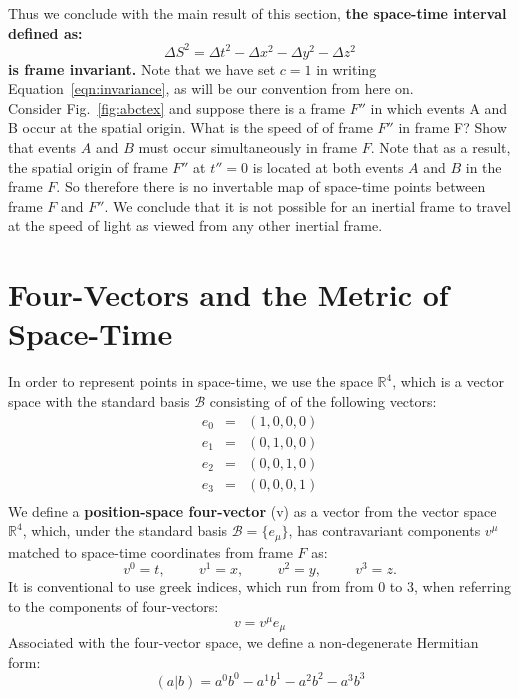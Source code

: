 \documentclass[12pt]{article}
\begin{document}
Thus we conclude with the main result of this section, {\bf the
  space-time interval defined as:}
\begin{equation}
 \label{eqn:invariance}
  \Delta S^2 = \Delta t^2 - \Delta x^2 - \Delta y^2 - \Delta z^2
\end{equation}
{\bf is frame invariant.}  Note that we have set $c=1$ in writing
Equation~\ref{eqn:invariance}, as will be our convention from here on.\\[4pt]

\exercise Consider Fig.~\ref{fig:abctex} and suppose there is a frame
$F''$ in which events A and B occur at the spatial origin.  What is
the speed of of frame $F''$ in frame F?  Show that events $A$ and $B$
must occur simultaneously in frame $F$.  Note that as a result, the
spatial origin of frame $F''$ at $t''=0$ is located at both events $A$
and $B$ in the frame $F$.  So therefore there is no invertable map of
space-time points between frame $F$ and $F''$.  We conclude that it is
not possible for an inertial frame to travel at the speed of light as
viewed from any other inertial frame.

\section{Four-Vectors and the Metric of Space-Time}

In order to represent points in space-time, we use the space
$\mathbb{R}^4$, which is a vector space with the standard basis
$\mathcal{B}$ consisting of of the following vectors:
\begin{eqnarray*}
  e_0 &=& (1,0,0,0) \\
  e_1 &=& (0,1,0,0) \\
  e_2 &=& (0,0,1,0) \\
  e_3 &=& (0,0,0,1) \\
\end{eqnarray*}
We define a {\bf position-space four-vector} (v) as a vector from the
vector space $\mathbb{R}^4$, which, under the standard basis $\mathcal{B}=\{e_\mu\}$, has contravariant components $v^\mu$ matched to space-time
coordinates from frame $F$ as:
\begin{equation}
  v^0 = t, \hspace{1cm} v^1 = x, \hspace{1cm} v^2 = y, \hspace{1cm} v^3 = z.
\end{equation}
It is conventional to use greek indices, which run from from 0 to 3, when referring to the components of four-vectors:
$$v = v^\mu e_\mu$$
Associated with the four-vector space, we define a non-degenerate
Hermitian form:
\begin{equation}
\label{eqn:ndhf}
(a|b) = a^0 b^0 - a^1 b^1 - a^2 b^2 - a^3 b^3
\end{equation}
\end{document}
